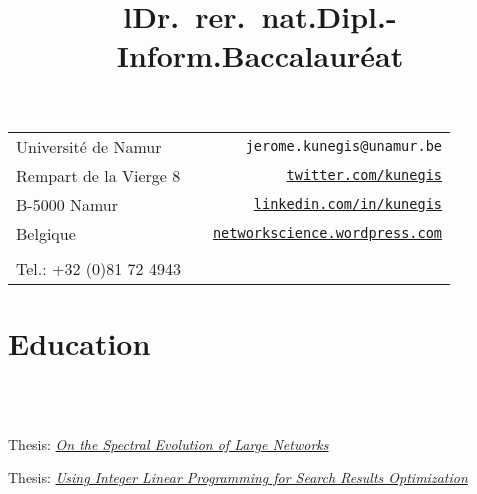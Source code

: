 \documentclass[line,margin]{res}
\begin{document}
\begin{resume}

\vspace{0.5cm}

\hspace{-3cm}
\begin{tabular}{lcr}
  Université de Namur    &\hspace{6.3cm}\hfill& {\tt jerome.kunegis@unamur.be} \\
  Rempart de la Vierge 8 &                    & {\tt \href{http://twitter.com/kunegis}{twitter.com/kunegis}} \\
  B-5000 Namur           &                    & {\tt \href{http://www.linkedin.com/in/kunegis}{linkedin.com/in/kunegis}} \\
  Belgique               &                    & {\tt \href{http://networkscience.wordpress.com/}{networkscience.wordpress.com}} \\
  & & \\
  Tel.:  +32 (0)81 72 4943
\end{tabular}
\vspace{1cm}

\section{Education}

\begin{format}
\title{l}\\
\\
\end{format}

\title{\bf Dr.\ rer.\ nat.}
\begin{position}
Thesis:
\emph{\href{https://kola.opus.hbz-nrw.de/frontdoor/index/index/docId/581}{On
    the Spectral Evolution of Large Networks}}  
\end{position}

\title{\bf Dipl.-Inform.}
\begin{position}
Thesis: \emph{\href{https://pdfs.semanticscholar.org/42ca/e9b00864ee09bc9bc92ef3d411e20b966a8d.pdf}{Using Integer Linear Programming for Search Results Optimization}}
\end{position}

\title{\bf Baccalauréat}
\begin{position}
\end{position}


\end{resume}
\end{document}
